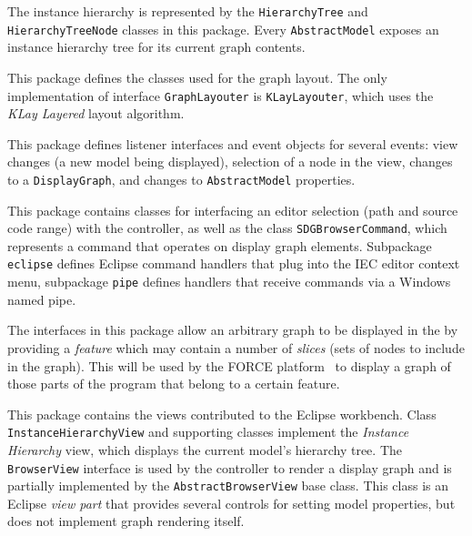 \begin{description}
   The instance hierarchy is represented by the \lstinline|HierarchyTree| and 
  \lstinline|HierarchyTreeNode| classes in this package. Every \lstinline|AbstractModel| exposes an instance hierarchy 
  tree for its current graph contents.
  
   This package defines the classes used for the graph layout. The only implementation of 
  interface \lstinline|GraphLayouter| is \lstinline|KLayLayouter|, which uses the \emph{KLay Layered}\footnotemark{} 
  layout algorithm.
  
  
   This package defines listener interfaces and event objects for several events: view changes (a new 
  model being displayed), selection of a node in the view, changes to a \lstinline|DisplayGraph|, and changes to 
  \lstinline|AbstractModel| properties.
  
   This package contains classes for interfacing an editor selection (path and source code range) with 
  the \SB controller, as well as the class \lstinline|SDGBrowserCommand|, which represents a command that operates on 
  display graph elements. Subpackage \lstinline|eclipse| defines Eclipse command handlers that plug into the IEC editor 
  context menu, subpackage \lstinline|pipe| defines handlers that receive commands via a Windows named pipe.
  
   The interfaces in this package allow an arbitrary graph to be displayed in the \SB by 
  providing a \emph{feature} which may contain a number of \emph{slices} (sets of nodes to include in the graph). This 
  will be used by the FORCE platform~\cite{HinterreiterDA} to display a graph of those parts of the program that belong 
  to a certain feature.
  
   This package contains the views contributed to the Eclipse workbench. Class 
  \lstinline|InstanceHierarchyView| and supporting classes implement the \emph{Instance Hierarchy} view, which displays 
  the current model's hierarchy tree. The \lstinline|BrowserView| interface is used by the controller to render a 
  display graph and is partially implemented by the \lstinline|AbstractBrowserView| base class. This class is an 
  Eclipse \emph{view part} that provides several controls for setting model properties, but does not implement graph 
  rendering itself.
  

\end{description}

